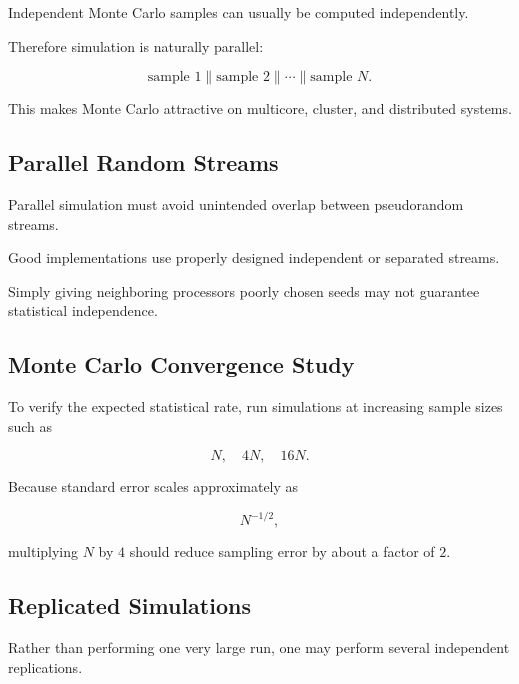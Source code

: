Independent Monte Carlo samples can usually be computed independently.

Therefore simulation is naturally parallel:

\[
\boxed{
\text{sample }1
\parallel
\text{sample }2
\parallel
\cdots
\parallel
\text{sample }N.
}
\]

This makes Monte Carlo attractive on multicore, cluster, and distributed
systems.

\subsection{Parallel Random Streams}
\label{subsec:parallel-random-streams}

Parallel simulation must avoid unintended overlap between pseudorandom
streams.

Good implementations use properly designed independent or separated
streams.

Simply giving neighboring processors poorly chosen seeds may not guarantee
statistical independence.

\subsection{Monte Carlo Convergence Study}
\label{subsec:mc-convergence-study}

To verify the expected statistical rate, run simulations at increasing
sample sizes such as

\[
N,
\quad
4N,
\quad
16N.
\]

Because standard error scales approximately as

\[
N^{-1/2},
\]

multiplying \(N\) by \(4\) should reduce sampling error by about a factor of
\(2\).

\subsection{Replicated Simulations}
\label{subsec:replicated-monte-carlo}

Rather than performing one very large run, one may perform several
independent replications.

